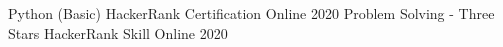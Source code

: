 \vspace{-2.0mm}

\begin{cvhonors}

  \cvhonor
  {Python (Basic)}
  {HackerRank Certification}
  {Online}
  {2020}
  \cvhonor
    {Problem Solving - Three Stars} %
    {HackerRank Skill}
    {Online} %
    {2020} %
\end{cvhonors}